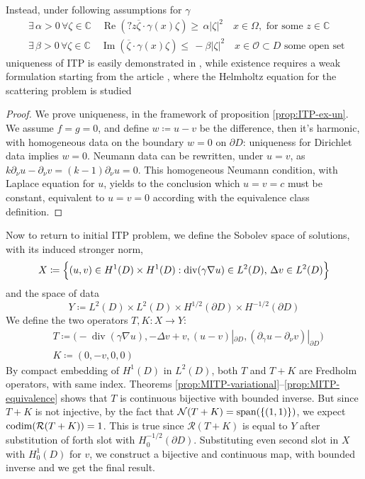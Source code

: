 \documentclass[10pt, a4paper, twoside, openright]{book}
\theoremstyle{definition}
\theoremstyle{plain}
\theoremstyle{plain}
\theoremstyle{plain}
\theoremstyle{plain}
\theoremstyle{plain}
\theoremstyle{plain}
\theoremstyle{plain}
\theoremstyle{plain}
\DeclareMathOperator{\divergence}{div}
\DeclareMathOperator{\real}{Re}
\DeclareMathOperator{\imag}{Im}
\begin{document}
Instead, under following assumptions for $\gamma$
\begin{align}
 &\exists\, \alpha>0\,\forall \zeta \in \mathbb{C}\quad \real(?z\overline{\zeta}\cdot\gamma(x)\zeta)     \geq\,  \alpha|\zeta|^2 \quad x\in \Omega, \text{ for some } z \in \mathbb{C}\\
 &\exists\, \beta>0\,\forall \zeta \in \mathbb{C}\quad \imag(\overline{\zeta}\cdot\gamma(x)\zeta)        \leq\,  -\beta|\zeta|^2 \quad x\in \mathcal{O} \subset D \text{ some open set }
\end{align}
uniqueness  of ITP is easily demonstrated in \cite{somersalo:preprint}, while existence requires a weak formulation starting from the article \cite{cakoni-colton-haddar:lsm}, where the Helmholtz equation for the scattering problem is studied
\begin{proof}
 We prove uniqueness, in the framework of proposition \ref{prop:ITP-ex-un}. 
 We assume $f=g=0$, and define $w\coloneqq u-v$ be the difference, then it's harmonic, 
 with homogeneous data on the boundary $w=0$ on $\partial D$: uniqueness for Dirichlet data implies $w=0$. Neumann data can be rewritten, under $u=v$, as $k\partial_\nu u - \partial_\nu v = (k-1)\partial_\nu u = 0$.
 This homogeneous Neumann condition, with Laplace equation for $u$, yields to the conclusion which $u=v=c$ must be constant, equivalent to $u=v=0$ according with the equivalence class definition.
\end{proof}
Now to return to initial ITP problem, we define the Sobolev space of solutions, with its induced stronger norm,
\begin{equation}
 X\coloneqq\Bigl\{(u,v)\in H^1(D)\times H^1(D):\divergence(\gamma\nabla u)\in L^2(D),\,\Delta v\in L^2(D) \Bigr\}
\end{equation}
and the space of data
\begin{equation}
 Y\coloneqq L^2(D) \times L^2(D) \times H^{1/2}(\partial D) \times H^{-1/2}(\partial D)
\end{equation}
We define the two operators $T,K:X\to Y$:
\begin{align}
& T \coloneqq \bigl(-\divergence(\gamma\nabla u), -\Delta v + v, (u - v)|_{\partial D}, (\partial_\gamma u -\partial_\nu v)|_{\partial D}\bigr)\\
& K \coloneqq (0, -v, 0 , 0)
\end{align}
By compact embedding of $H^1(D)$ in $L^2(D)$, both $T$ and $T+K$ are Fredholm operators, with same index. Theorems \ref{prop:MITP-variational}--\ref{prop:MITP-equivalence} shows that $T$ is continuous bijective with bounded inverse. But since $T+K$ is not injective, by the fact that $\mathcal{N}(T+K)=\textup{span}(\{(1,1)\})$, we expect $\textup{codim}(\mathcal{R}(T+K))=1$. This is true since $\mathcal{R}(T+K)$ is equal to $Y$ after substitution of forth slot with $H^{-1/2}_0(\partial D)$. Substituting even second slot in $X$ with $H^1_0(D)$ for $v$, we construct a bijective and continuous map, with bounded inverse and we get the final result.
\end{document}
